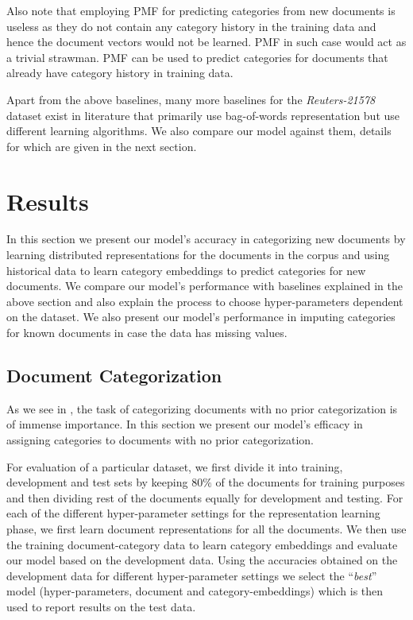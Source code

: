 \begin{enumerate}
Also note that employing PMF for predicting categories from new documents is useless as they do not contain any category history in the training data and hence the document vectors would not be learned. PMF in such case would act as a trivial strawman. PMF can be used to predict categories for documents that already have category history in training data. 

\end{enumerate}
Apart from the above baselines, many more baselines for the \emph{Reuters-21578} dataset exist in literature that primarily use bag-of-words representation but use different learning algorithms. We also compare our model against them, details for which are given in the next section.

\section{Results}
\label{sec:results}
In this section we present our model's accuracy in categorizing new documents by learning distributed representations for the documents in the corpus and using historical data to learn category embeddings to predict categories for new documents. We compare our model's performance with baselines explained in the above section and also explain the process to choose hyper-parameters dependent on the dataset. 
We also present our model's performance in imputing categories for known documents in case the data has missing values. 

\subsection{Document Categorization}
As we see in , the task of categorizing documents with no prior categorization is of immense importance. In this section we present our model's efficacy in assigning categories to documents with no prior categorization. 

For evaluation of a particular dataset, we first divide it into training, development and test sets by keeping $80\%$ of the documents for training purposes and then dividing rest of the documents equally for development and testing. For each of the different hyper-parameter settings for the representation learning phase, we first learn document representations for all the documents. We then use the training document-category data to learn category embeddings and evaluate our model based on the development data. Using the accuracies obtained on the development data for different hyper-parameter settings we select the ``\emph{best}'' model (hyper-parameters, document and category-embeddings) which is then used to report results on the test data.

